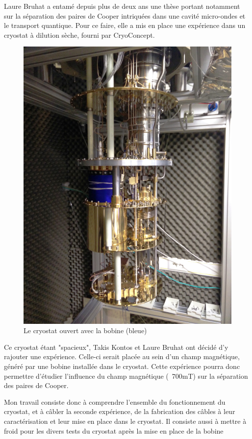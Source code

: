 
Laure Bruhat a entamé depuis plus de deux ans une thèse portant notamment sur la séparation des paires de Cooper intriquées dans une cavité micro-ondes et le transport quantique. Pour ce faire, elle a mis en place une expérience dans un cryostat à dilution sèche, fourni par CryoConcept.
\newline
\begin{figure}[h]
    \begin{center}
        \includegraphics[height=0.7\textwidth]{Images/Global.jpg}
        \caption*{Le cryostat ouvert avec la bobine (bleue)}
        \label{photo_separateur_nanotube}
    \end{center}
\end{figure}


Ce cryostat étant "spacieux", Takis Kontos et Laure Bruhat ont décidé d'y rajouter une expérience. Celle-ci serait placée au sein d'un champ magnétique, généré par une bobine installée dans le cryostat. Cette expérience pourra donc permettre d'étudier l'influence du champ magnétique (~700mT) sur la séparation des paires de Cooper.
\newline

Mon travail consiste donc à comprendre l'ensemble du fonctionnement du cryostat, et à câbler la seconde expérience, de la fabrication des câbles à leur caractérisation et leur mise en place dans le cryostat. Il consiste aussi à mettre à froid pour les divers tests du cryostat après la mise en place de la bobine
